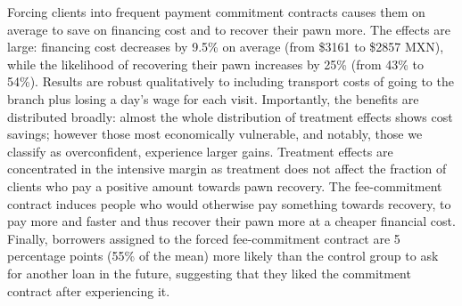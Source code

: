 \documentclass[oneside,11pt]{article}
\begin{document}
Forcing clients into frequent payment commitment contracts causes them on average to save on financing cost and to recover their pawn more. The effects are large: financing cost decreases by 9.5\% on average (from \$3161 to \$2857 MXN), while the likelihood of recovering their pawn increases by 25\% (from 43\% to 54\%). Results are robust qualitatively to including transport costs of going to the branch plus losing a day's wage for each visit. Importantly, the benefits are distributed broadly: almost the whole distribution of treatment effects shows cost savings; however those most economically vulnerable, and notably, those we classify as overconfident, experience larger gains. %
Treatment effects are concentrated in the intensive margin as treatment does not affect the fraction of clients who pay a positive amount towards pawn recovery. The fee-commitment contract induces people who would otherwise pay something towards recovery, to pay more and faster and thus recover their pawn more at a cheaper financial cost. Finally, borrowers assigned to the forced fee-commitment contract are 5 percentage points (55\% of the mean) more likely than the control group to ask for another loan in the future, suggesting that they liked the commitment contract after experiencing it.

\end{document}
